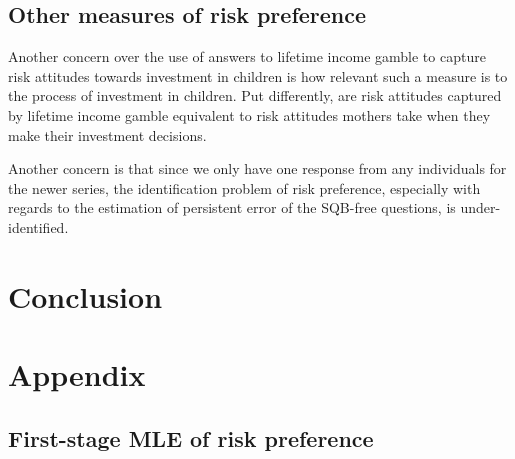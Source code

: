 \documentclass[]{article}
\begin{document}
\subsection{Other measures of risk preference}

Another concern over the use of answers to lifetime income gamble to capture risk attitudes towards investment in children is how relevant such a measure is to the process of investment in children. Put differently, are risk attitudes captured by lifetime income gamble equivalent to risk attitudes mothers take when they make their investment decisions.  



Another concern is that since we only have one response from any individuals for the newer series, the identification problem of risk preference, especially with regards to the estimation of persistent error of the SQB-free questions, is under-identified. 




\section{Conclusion}

\pagebreak

\section{Appendix}
\subsection{First-stage MLE of risk preference}
\end{document}
